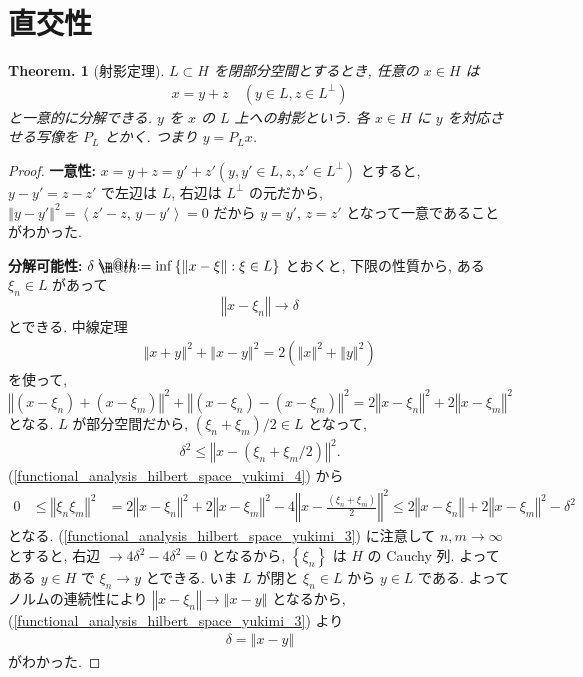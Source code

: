 \documentclass[openany, a4paper, oneside]{book}
\makeatletter
\newcommand*{\defeq}{\mathrel{\rlap{%
\raisebox{0.3ex}{$\m@th\cdot$}}%
\raisebox{-0.3ex}{$\m@th\cdot$}}%
=}
\theoremstyle{break}
\newtheorem{thm}{Theorem.}[section]
\theoremstyle{breakdefn}
\newcommand{\norm}[1]{\left\Vert#1\right\Vert}
\newcommand{\rbk}[1]{\left (#1\right)}
\newcommand{\cbk}[1]{\left\{#1\right\}}
\newcommand{\bkt}[2]{\left\langle#1,\,#2\right\rangle}
\newcommand{\set}[2]{\left\{#1 : #2\right\}}
\makeatother
\begin{document}
\section{直交性}
\label{sec-7-13-3}

\begin{thm}[射影定理]
 $L \subset H$ を閉部分空間とするとき, 任意の $x \in H$ は
 \begin{align}
  x
  =
  y + z \quad (y \in L, z \in L^{\perp})
 \end{align}
 と一意的に分解できる.
 $y$ を $x$ の $L$ 上への射影という.
 各 $x \in H$ に $y$ を対応させる写像を $P_{L}$ とかく.
 つまり $y = P_{L}x$.
\end{thm}
\begin{proof}
\textbf{一意性:}
$x = y + z = y' + z' (y, y'\in L, z, z'\in L^{\perp})$ とすると,
$y - y' = z - z'$ で左辺は $L$, 右辺は $L^{\perp}$ の元だから,
$\norm{y - y'}^2 = \bkt{z' - z}{y - y'} = 0$ だから $y = y' $, $z = z'$ となって一意であることがわかった.

\textbf{分解可能性:}
$\delta \defeq \inf \set{\norm{x - \xi}}{\xi \in L}$ とおくと,
下限の性質から, ある $\xi_{n} \in L$ があって
\begin{equation}
 \norm{x - \xi_n}
 \longrightarrow
 \delta \label{functional_analysis_hilbert_space_yukimi_3}
\end{equation}
とできる.
中線定理
\begin{align}
 \norm{x + y}^2 + \norm{x - y}^2
 =
 2 \rbk{\norm{x}^2 + \norm{y}^2}
\end{align}
を使って,
\begin{equation}
 \norm{\rbk{x - \xi_n} + \rbk{x - \xi_m}}^2 + \norm{\rbk{x - \xi_n} - \rbk{x - \xi_m}}^2
 =
 2 \norm{x - \xi_n}^2 + 2 \norm{x - \xi_m}^2 \label{functional_analysis_hilbert_space_yukimi_4}
\end{equation}
となる.
$L$ が部分空間だから, $\rbk{\xi_{n} + \xi_{m}} / 2 \in L$ となって,
\begin{align}
 \delta^2
 \leq
 \norm{x - \rbk{\xi_{n} + \xi_{m}/2}}^2.
\end{align}
(\ref{functional_analysis_hilbert_space_yukimi_4}) から
\begin{align}
 0
 &\leq
 \norm{\xi_n \xi_m}^2
 &=
 2 \norm{x - \xi_n}^2 + 2 \norm{x - \xi_m}^2 - 4 \norm{x - \frac{\rbk{\xi_n + \xi_m}}{2}}^2
 \leq
 2 \norm{x - \xi_n} + 2 \norm{x - \xi_m}^2 - \delta^2
\end{align}
となる.
(\ref{functional_analysis_hilbert_space_yukimi_3}) に注意して
$n, m \to \infty$ とすると,
右辺 $\to 4 \delta^2 - 4\delta^2 = 0$ となるから,
$\cbk{\xi_{n}}$ は $H$ の Cauchy 列.
よってある $y \in H$ で $\xi_{n} \to y$ とできる.
いま $L$ が閉と $\xi_{n} \in L$ から $y \in L$ である.
よってノルムの連続性により $\norm{x - \xi_{n}} \to \norm{x - y}$ となるから,
(\ref{functional_analysis_hilbert_space_yukimi_3}) より
\begin{align}
 \delta
 =
 \norm{x - y}
\end{align}
がわかった.


\end{proof}
\end{document}
